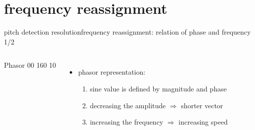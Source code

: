     \section{frequency reassignment}
        \begin{frame}{pitch detection resolution}{frequency reassignment: relation of phase and frequency 1/2}
            \begin{columns}
            \vspace{-10mm}
                {Phasor}
                {00}
                {160}
                {10}
            \begin{itemize}
                \item   phasor representation:
										\smallskip
                    \begin{enumerate}
                        \item   sine value is defined by magnitude and phase
												\smallskip
                        \item   decreasing the amplitude $\Rightarrow$ shorter vector
                        \smallskip
												\item   increasing the frequency $\Rightarrow$ increasing speed
                    \end{enumerate}
            \end{itemize}
            \end{columns}
        \end{frame}


